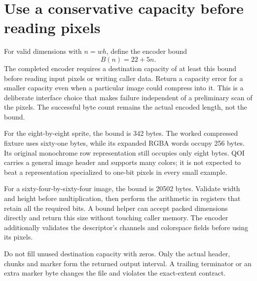 \section{Use a conservative capacity before reading pixels}
For valid dimensions with \(n=wh\), define the encoder bound
\[
  B(n)=22+5n.
\]
The completed encoder requires a destination capacity of at least this bound before
reading input pixels or writing caller data. Return a capacity error for a smaller
capacity even when a particular image could compress into it. This is a deliberate
interface choice that makes failure independent of a preliminary scan of the pixels.
The successful byte count remains the actual encoded length, not the bound.

For the eight-by-eight sprite, the bound is 342 bytes. The worked compressed fixture
uses sixty-one bytes, while its expanded RGBA words occupy 256 bytes. Its original
monochrome row representation still occupies only eight bytes. QOI carries a general
image header and supports many colors; it is not expected to beat a representation
specialized to one-bit pixels in every small example.

For a sixty-four-by-sixty-four image, the bound is 20502 bytes. Validate width and height
before multiplication, then perform the arithmetic in registers that retain all the
required bits. A bound helper can accept packed dimensions directly and return this
size without touching caller memory. The encoder additionally validates the descriptor's
channels and colorspace fields before using its pixels.

Do not fill unused destination capacity with zeros. Only the actual header, chunks
and marker form the returned output interval. A trailing terminator or an extra marker
byte changes the file and violates the exact-extent contract.
